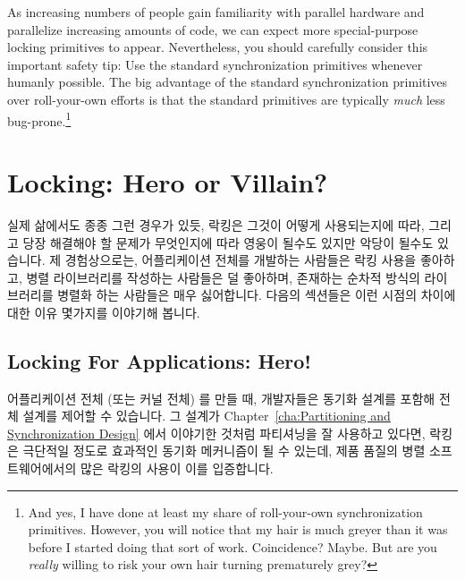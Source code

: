 As increasing numbers of people gain familiarity with parallel hardware
and parallelize increasing amounts of code, we can expect more
special-purpose locking primitives to appear.
Nevertheless, you should carefully consider this important safety tip:
Use the standard synchronization primitives whenever humanly possible.
The big advantage of the standard synchronization primitives over
roll-your-own efforts is that the standard primitives are typically
\emph{much} less bug-prone.\footnote{
	And yes, I have done at least my share of roll-your-own
	synchronization primitives.
	However, you will notice that my hair is much greyer than
	it was before I started doing that sort of work.
	Coincidence?
	Maybe.
	But are you \emph{really} willing to risk your own hair turning
	prematurely grey?}
\fi



\section{Locking: Hero or Villain?}
\label{sec:locking:Locking: Hero or Villain?}

실제 삶에서도 종종 그런 경우가 있듯, 락킹은 그것이 어떻게 사용되는지에 따라,
그리고 당장 해결해야 할 문제가 무엇인지에 따라 영웅이 될수도 있지만 악당이
될수도 있습니다.
제 경험상으로는, 어플리케이션 전체를 개발하는 사람들은 락킹 사용을 좋아하고,
병렬 라이브러리를 작성하는 사람들은 덜 좋아하며, 존재하는 순차적 방식의
라이브러리를 병렬화 하는 사람들은 매우 싫어합니다.
다음의 섹션들은 이런 시점의 차이에 대한 이유 몇가지를 이야기해 봅니다.

\subsection{Locking For Applications: Hero!}
\label{sec:locking:Locking For Applications: Hero!}

어플리케이션 전체 (또는 커널 전체) 를 만들 때, 개발자들은 동기화 설계를 포함해
전체 설계를 제어할 수 있습니다.
그 설계가 Chapter~\ref{cha:Partitioning and Synchronization Design} 에서
이야기한 것처럼 파티셔닝을 잘 사용하고 있다면, 락킹은 극단적일 정도로 효과적인
동기화 메커니즘이 될 수 있는데, 제품 품질의 병렬 소프트웨어에서의 많은 락킹의
사용이 이를 입증합니다.
\iffalse

